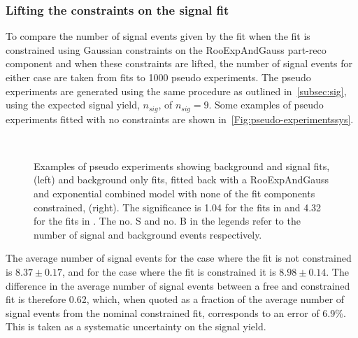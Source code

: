 \subsubsection{Lifting the constraints on the signal fit}
\label{sec:rr}
To compare the number of signal events given by the fit when the fit is constrained using Gaussian constraints on the RooExpAndGauss part-reco component and when these constraints are lifted, the number of signal events for either case are taken from fits to 1000 pseudo experiments. The pseudo experiments are generated using the same procedure as outlined in~\autoref{subsec:sig}, using the expected signal yield, $n_{sig}$, of $n_{sig} = 9$. Some examples of pseudo experiments fitted with no constraints are shown in~\autoref{Fig:pseudo-experimentssys}.
\begin{figure}[h!]
  \def\nh{0.7\textwidth}
  \centering
  \vspace*{-1.5cm}
    \hspace*{-1.5cm}%
     \\
    \hspace*{-1.5cm}
  \caption{Examples of pseudo experiments showing background and signal fits, (left) and background only fits, fitted back with a RooExpAndGauss and exponential combined model with none of the fit components constrained, (right). The significance is 1.04 for the fits in \protect{} and 4.32 for the fits in  \protect{}. The no. S and no. B in the legends refer to the number of signal and background events respectively.}
  \label{Fig:pseudo-experimentssys}
\end{figure}


The average number of signal events for the case where the fit is not constrained is $8.37\pm0.17$, and for the case where the fit is constrained it is $8.98\pm0.14$. The difference in the average number of signal events between a free and constrained fit is therefore 0.62, which, when quoted as a fraction of the average number of signal events from the nominal constrained fit, corresponds to an error of 6.9\%. This is taken as a systematic uncertainty on the \Lbpi signal yield. %

